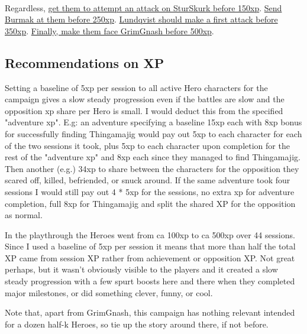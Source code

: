 \

Regardless, 
\hyperref[02killthebandits]{get them to attempt an attack on SturSkurk before 150xp}. 
\hyperref[03defendhoomhool]{Send Burmak at them before 250xp}. 
\hyperref[03defendhoomhool]{Lundqvist should make a first attack before 350xp}. \hyperref[05deathbygrimgnash]{Finally, make them face GrimGnash before 500xp}.


\subsection*{Recommendations on XP}

Setting a baseline of 5xp per session to all active Hero characters for the campaign gives a slow steady progression even if the battles are slow and the opposition xp share per Hero is small. I would deduct this from the specified "adventure xp". E.g: an adventure specifying a baseline 15xp each with 8xp bonus for successfully finding Thingamajig would pay out 5xp to each character for each of the two sessions it took, plus 5xp to each character upon completion for the rest of the "adventure xp" and 8xp each since they managed to find Thingamajig. Then another (e.g.) 34xp to share between the characters for the opposition they scared off, killed, befriended, or snuck around. If the same adventure took four sessions I would still pay out 4 * 5xp for the sessions, no extra xp for adventure completion, full 8xp for Thingamajig and split the shared XP for the opposition as normal.

In the playthrough the Heroes went from ca 100xp to ca 500xp over 44 sessions. Since I used a baseline of 5xp per session it means that more than half the total XP came from session XP rather from achievement or opposition XP. Not great perhaps, but it wasn't obviously visible to the players and it created a slow steady progression with a few spurt boosts here and there when they completed major milestones, or did something clever, funny, or cool.

Note that, apart from GrimGnash, this campaign has nothing relevant intended for a dozen half-k Heroes, so tie up the story around there, if not before. 








\clearpage
